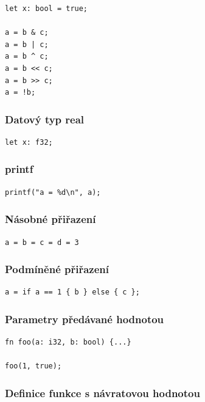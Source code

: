 \documentclass[12pt,a4paper]{article}
\begin{document}
\begin{verbatim}
let x: bool = true;

a = b & c;
a = b | c;
a = b ^ c;
a = b << c;
a = b >> c;
a = !b;
\end{verbatim}

\subsubsection*{Datový typ real}

\begin{verbatim}
let x: f32;
\end{verbatim}

\subsubsection*{printf}

\begin{verbatim}
printf("a = %d\n", a);
\end{verbatim}

\subsubsection*{Násobné přiřazení}

\begin{verbatim}
a = b = c = d = 3
\end{verbatim}

\subsubsection*{Podmíněné přiřazení}

\begin{verbatim}
a = if a == 1 { b } else { c };
\end{verbatim}

\subsubsection*{Parametry předávané hodnotou}

\begin{verbatim}
fn foo(a: i32, b: bool) {...}

foo(1, true);
\end{verbatim}

\subsubsection*{Definice funkce s návratovou hodnotou}
\end{document}
